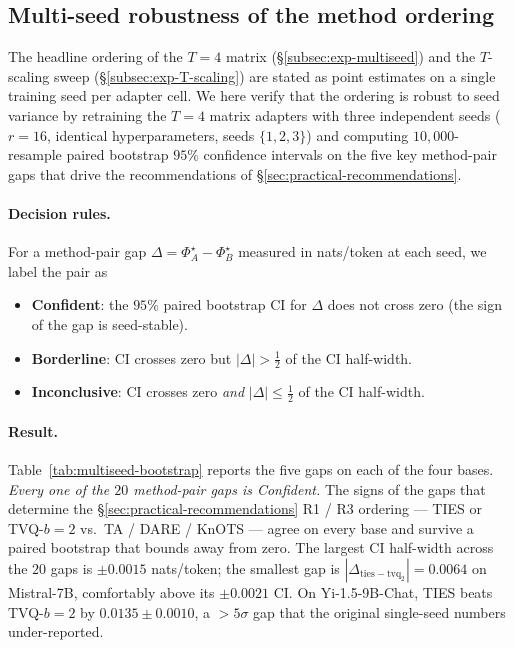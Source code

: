 
\subsection{Multi-seed robustness of the method ordering}
\label{subsec:exp-multiseed-bootstrap}

The headline ordering of the $T = 4$ matrix
(\S\ref{subsec:exp-multiseed}) and the $T$-scaling sweep
(\S\ref{subsec:exp-T-scaling}) are stated as point estimates on a
single training seed per adapter cell. We here verify that the
ordering is robust to seed variance by retraining the $T = 4$ matrix
adapters with three independent seeds ($r = 16$, identical
hyperparameters, seeds $\{1, 2, 3\}$) and computing $10{,}000$-resample
paired bootstrap $95\%$ confidence intervals on the five key
method-pair gaps that drive the recommendations of
\S\ref{sec:practical-recommendations}.

\paragraph{Decision rules.} For a method-pair gap
$\Delta = \Phi^\star_A - \Phi^\star_B$ measured in nats/token at
each seed, we label the pair as
\begin{itemize}[topsep=2pt,itemsep=2pt]
  \item \textbf{Confident}: the $95\%$ paired bootstrap CI for $\Delta$
        does not cross zero (the sign of the gap is seed-stable).
  \item \textbf{Borderline}: CI crosses zero but
        $|\Delta| > \tfrac{1}{2}$ of the CI half-width.
  \item \textbf{Inconclusive}: CI crosses zero \emph{and}
        $|\Delta| \leq \tfrac{1}{2}$ of the CI half-width.
\end{itemize}

\paragraph{Result.} Table~\ref{tab:multiseed-bootstrap} reports the
five gaps on each of the four bases. \emph{Every one of the $20$
method-pair gaps is Confident.} The signs of the gaps that determine
the \S\ref{sec:practical-recommendations} R1 / R3 ordering ---
TIES or TVQ-$b{=}2$ vs.\ TA / DARE / KnOTS --- agree on every base
and survive a paired bootstrap that bounds away from zero. The
largest CI half-width across the $20$ gaps is $\pm 0.0015$
nats/token; the smallest gap is $|\Delta_{\mathrm{ties-tvq_2}}| =
0.0064$ on Mistral-7B, comfortably above its $\pm 0.0021$ CI. On
Yi-1.5-9B-Chat, TIES beats TVQ-$b{=}2$ by $0.0135 \pm 0.0010$, a
$> 5\sigma$ gap that the original single-seed numbers under-reported.

